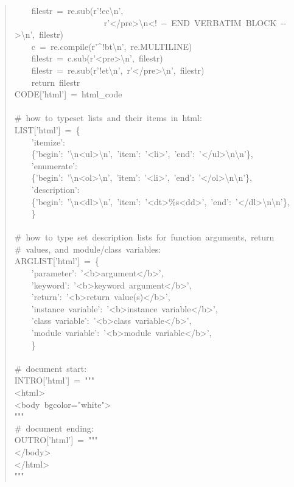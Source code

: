 \documentclass[a4paper]{article}
\begin{document}
\begin{quote}
{~~~~filestr~=~re.sub(r'!ec\textbackslash{}n',\\
~~~~~~~~~~~~~~~~~~~~~r'</pre>\textbackslash{}n<!~-{}-~END~VERBATIM~BLOCK~-{}->\textbackslash{}n',~filestr)\\
~~~~c~=~re.compile(r'\textasciicircum{}!bt\textbackslash{}n',~re.MULTILINE)\\
~~~~filestr~=~c.sub(r'<pre>\textbackslash{}n',~filestr)\\
~~~~filestr~=~re.sub(r'!et\textbackslash{}n',~r'</pre>\textbackslash{}n',~filestr)\\
~~~~return~filestr\\
CODE{[}'html'{]}~=~html\_code\\
~\\
\#~how~to~typeset~lists~and~their~items~in~html:\\
LIST{[}'html'{]}~=~\{\\
~~~~'itemize':\\
~~~~\{'begin':~'\textbackslash{}n<ul>\textbackslash{}n',~'item':~'<li>',~'end':~'</ul>\textbackslash{}n\textbackslash{}n'\},\\
~~~~'enumerate':\\
~~~~\{'begin':~'\textbackslash{}n<ol>\textbackslash{}n',~'item':~'<li>',~'end':~'</ol>\textbackslash{}n\textbackslash{}n'\},\\
~~~~'description':\\
~~~~\{'begin':~'\textbackslash{}n<dl>\textbackslash{}n',~'item':~'<dt>\%s<dd>',~'end':~'</dl>\textbackslash{}n\textbackslash{}n'\},\\
~~~~\}\\
~\\
\#~how~to~type~set~description~lists~for~function~arguments,~return\\
\#~values,~and~module/class~variables:\\
ARGLIST{[}'html'{]}~=~\{\\
~~~~'parameter':~'<b>argument</b>',\\
~~~~'keyword':~'<b>keyword~argument</b>',\\
~~~~'return':~'<b>return~value(s)</b>',\\
~~~~'instance~variable':~'<b>instance~variable</b>',\\
~~~~'class~variable':~'<b>class~variable</b>',\\
~~~~'module~variable':~'<b>module~variable</b>',\\
~~~~\}\\
~\\
\#~document~start:\\
INTRO{[}'html'{]}~=~"{}"{}"\\
<html>\\
<body~bgcolor="white">\\
"{}"{}"\\
\#~document~ending:\\
OUTRO{[}'html'{]}~=~"{}"{}"\\
</body>\\
</html>\\
"{}"{}"
}
\end{quote}
\end{document}
